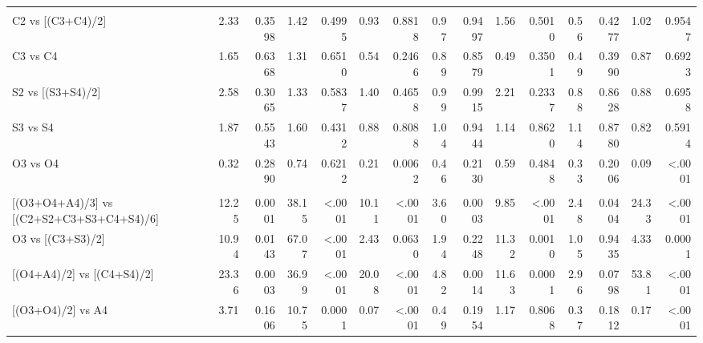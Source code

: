 \documentclass[
]{article}
\begin{document}
\begin{landscape}
\begin{table}[H]
{\begin{threeparttable}
\begin{tabular}[t]{lr>{}r|r>{}r|r>{}r|r>{}r|r>{}r|r>{}r|rr}
\addlinespace[0.3em]
\multicolumn{15}{l}{\textbf{(A2) - Rotation system effects within individual crops}}\\
\hspace{1em}\hspace{1em}C2 vs [(C3+C4)/2] & 2.33 & 0.3598 & 1.42 & 0.4995 & 0.93 & 0.8818 & 0.97 & 0.9497 & 1.56 & 0.5010 & 0.56 & 0.4277 & 1.02 & 0.9547\\
\hspace{1em}\hspace{1em}C3 vs C4 & 1.65 & 0.6368 & 1.31 & 0.6510 & 0.54 & 0.2466 & 0.89 & 0.8579 & 0.49 & 0.3501 & 0.49 & 0.3990 & 0.87 & 0.6923\\
\hspace{1em}\hspace{1em}S2 vs [(S3+S4)/2] & 2.58 & 0.3065 & 1.33 & 0.5837 & 1.40 & 0.4658 & 0.99 & 0.9915 & 2.21 & 0.2337 & 0.88 & 0.8628 & 0.88 & 0.6958\\
\hspace{1em}\hspace{1em}S3 vs S4 & 1.87 & 0.5543 & 1.60 & 0.4312 & 0.88 & 0.8088 & 1.04 & 0.9444 & 1.14 & 0.8620 & 1.14 & 0.8780 & 0.82 & 0.5914\\
\hspace{1em}\hspace{1em}O3 vs O4 & 0.32 & 0.2890 & 0.74 & 0.6212 & 0.21 & 0.0062 & 0.46 & 0.2130 & 0.59 & 0.4848 & 0.33 & 0.2006 & 0.09 & <.0001\\
\addlinespace[0.3em]
\multicolumn{15}{l}{\textbf{(A3) - Crop type effects}}\\
\hspace{1em}\hspace{1em}{}[(O3+O4+A4)/3] vs [(C2+S2+C3+S3+C4+S4)/6] & 12.25 & 0.0001 & 38.15 & <.0001 & 10.11 & <.0001 & 3.60 & 0.0003 & 9.85 & <.0001 & 2.48 & 0.0404 & 24.33 & <.0001\\
\hspace{1em}\hspace{1em}O3 vs [(C3+S3)/2] & 10.94 & 0.0143 & 67.07 & <.0001 & 2.43 & 0.0630 & 1.94 & 0.2248 & 11.32 & 0.0010 & 1.05 & 0.9435 & 4.33 & 0.0001\\
\hspace{1em}\hspace{1em}{}[(O4+A4)/2] vs [(C4+S4)/2] & 23.36 & 0.0003 & 36.99 & <.0001 & 20.08 & <.0001 & 4.82 & 0.0014 & 11.63 & 0.0001 & 2.96 & 0.0798 & 53.81 & <.0001\\
\hspace{1em}\hspace{1em}{}[(O3+O4)/2] vs A4 & 3.71 & 0.1606 & 10.75 & 0.0001 & 0.07 & <.0001 & 0.49 & 0.1954 & 1.17 & 0.8068 & 0.37 & 0.1812 & 0.17 & <.0001\\

\end{tabular}
\end{threeparttable}}
\end{table}
\end{landscape}
\end{document}
